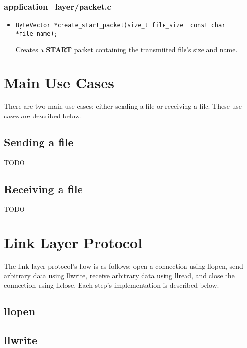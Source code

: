 \documentclass[11pt,a4paper]{article}
\begin{document}
\subsubsection{application\_layer/packet.c}

\begin{itemize}
    \item \begin{lstlisting}
ByteVector *create_start_packet(size_t file_size, const char *file_name);
    \end{lstlisting}

    Creates a \textbf{START} packet containing the transmitted file's size and name.

\end{itemize}

\section{Main Use Cases}

There are two main use cases: either sending a file or receiving a file.
These use cases are described below.

\subsection{Sending a file}

TODO

\subsection{Receiving a file}

TODO

\section{Link Layer Protocol}

The link layer protocol's flow is as follows: open a connection using llopen, send arbitrary data using llwrite, receive arbitrary data using llread, and close the connection using llclose. Each step's implementation is described below.

\subsection{llopen}

\subsection{llwrite}
\end{document}
